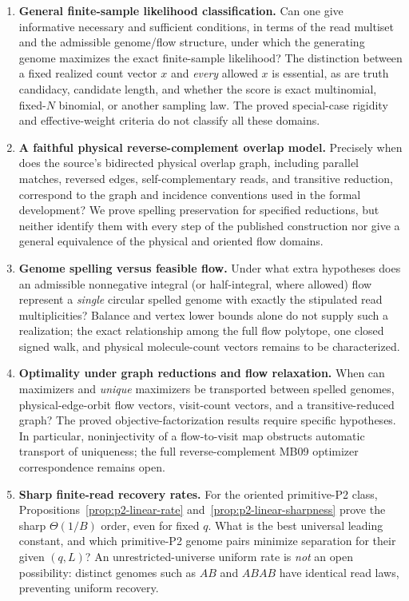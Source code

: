 \begin{enumerate}[label=\textbf{Q\arabic*.},leftmargin=*,itemsep=5pt,topsep=4pt]
\item \textbf{General finite-sample likelihood classification.}
Can one give informative necessary and sufficient conditions, in terms
of the read multiset and the admissible genome/flow structure, under
which the generating genome maximizes the exact finite-sample likelihood?
The distinction between a fixed realized count vector $x$ and
\emph{every} allowed $x$ is essential, as are truth candidacy,
candidate length, and whether the score is exact multinomial,
fixed-$N$ binomial, or another sampling law.  The proved special-case
rigidity and effective-weight criteria do not classify all these
domains.

\item \textbf{A faithful physical reverse-complement overlap model.}
Precisely when does the source's bidirected physical overlap graph,
including parallel matches, reversed edges, self-complementary reads,
and transitive reduction, correspond to the graph and incidence
conventions used in the formal development?
We prove spelling preservation for specified reductions, but neither
identify them with every step of the published construction nor give
a general equivalence of the physical and oriented flow domains.

\item \textbf{Genome spelling versus feasible flow.}
Under what extra hypotheses does an admissible nonnegative integral
(or half-integral, where allowed) flow represent a \emph{single}
circular spelled genome with exactly the stipulated read
multiplicities?  Balance and vertex lower bounds alone do not supply
such a realization; the exact relationship among the full flow
polytope, one closed signed walk, and physical molecule-count vectors
remains to be characterized.

\item \textbf{Optimality under graph reductions and flow relaxation.}
When can maximizers and \emph{unique} maximizers be transported between
spelled genomes, physical-edge-orbit flow vectors, visit-count vectors,
and a transitive-reduced graph?  The proved objective-factorization
results require specific hypotheses.  In particular, noninjectivity
of a flow-to-visit map obstructs automatic transport of uniqueness;
the full reverse-complement MB09 optimizer correspondence
remains open.

\item \textbf{Sharp finite-read recovery rates.}
For the oriented primitive-P2 class,
Propositions~\ref{prop:p2-linear-rate}
and~\ref{prop:p2-linear-sharpness} prove the sharp
$\Theta(1/B)$ order, even for fixed $q$.
What is the best universal leading constant, and
which primitive-P2 genome pairs minimize separation
for their given $(q,L)$?
An unrestricted-universe uniform rate is \emph{not} an open
possibility: distinct genomes such as $AB$ and $ABAB$ have identical
read laws, preventing uniform recovery.


\end{enumerate}
